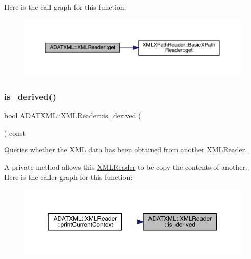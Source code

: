 Here is the call graph for this function\+:
\nopagebreak
\begin{figure}[H]
\begin{center}
\leavevmode
\includegraphics[width=350pt]{db/d3f/classADATXML_1_1XMLReader_ae3ba71a241315a5e90ba745fdc7e045b_cgraph}
\end{center}
\end{figure}
\mbox{\label{classADATXML_1_1XMLReader_a64fb149ae8809f993a7750aa5fe1f4b7}} 
\subsubsection{\texorpdfstring{is\_derived()}{is\_derived()}\hspace{0.1cm}{\footnotesize\ttfamily [1/2]}}
{\footnotesize\ttfamily bool A\+D\+A\+T\+X\+M\+L\+::\+X\+M\+L\+Reader\+::is\+\_\+derived (\begin{DoxyParamCaption}{ }\end{DoxyParamCaption}) const}



Queries whether the X\+ML data has been obtained from another \mbox{\hyperlink{classADATXML_1_1XMLReader}{X\+M\+L\+Reader}}. 

A private method allows this \mbox{\hyperlink{classADATXML_1_1XMLReader}{X\+M\+L\+Reader}} to be copy the contents of another. Here is the caller graph for this function\+:\nopagebreak
\begin{figure}[H]
\begin{center}
\leavevmode
\includegraphics[width=350pt]{db/d3f/classADATXML_1_1XMLReader_a64fb149ae8809f993a7750aa5fe1f4b7_icgraph}
\end{center}
\end{figure}
\mbox{\label{classADATXML_1_1XMLReader_a64fb149ae8809f993a7750aa5fe1f4b7}} 
